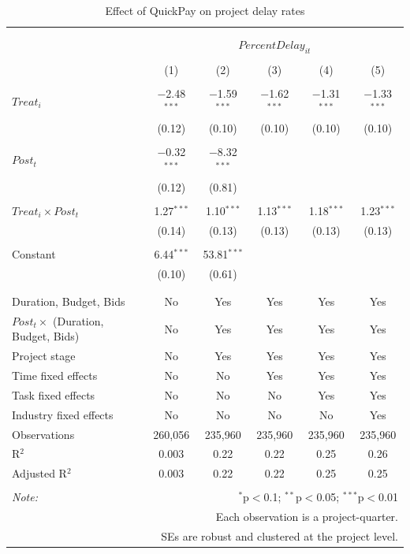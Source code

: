 \documentclass[
]{article}
\begin{document}
\begin{table}[H] \centering 
  \caption{Effect of QuickPay on project delay rates} 
  \label{} 
\small 
\begin{tabular}{@{\extracolsep{-2pt}}lccccc} 
\\[-1.8ex]\hline 
\hline \\[-1.8ex] 
\\[-1.8ex] & \multicolumn{5}{c}{$PercentDelay_{it}$} \\ 
\\[-1.8ex] & (1) & (2) & (3) & (4) & (5)\\ 
\hline \\[-1.8ex] 
 $Treat_i$ & $-$2.48$^{***}$ & $-$1.59$^{***}$ & $-$1.62$^{***}$ & $-$1.31$^{***}$ & $-$1.33$^{***}$ \\ 
  & (0.12) & (0.10) & (0.10) & (0.10) & (0.10) \\ 
  & & & & & \\ 
 $Post_t$ & $-$0.32$^{***}$ & $-$8.32$^{***}$ &  &  &  \\ 
  & (0.12) & (0.81) &  &  &  \\ 
  & & & & & \\ 
 $Treat_i \times Post_t$ & 1.27$^{***}$ & 1.10$^{***}$ & 1.13$^{***}$ & 1.18$^{***}$ & 1.23$^{***}$ \\ 
  & (0.14) & (0.13) & (0.13) & (0.13) & (0.13) \\ 
  & & & & & \\ 
 Constant & 6.44$^{***}$ & 53.81$^{***}$ &  &  &  \\ 
  & (0.10) & (0.61) &  &  &  \\ 
  & & & & & \\ 
\hline \\[-1.8ex] 
Duration, Budget, Bids & No & Yes & Yes & Yes & Yes \\ 
$Post_t \times$  (Duration, Budget, Bids) & No & Yes & Yes & Yes & Yes \\ 
Project stage & No & Yes & Yes & Yes & Yes \\ 
Time fixed effects & No & No & Yes & Yes & Yes \\ 
Task fixed effects & No & No & No & Yes & Yes \\ 
Industry fixed effects & No & No & No & No & Yes \\ 
Observations & 260,056 & 235,960 & 235,960 & 235,960 & 235,960 \\ 
R$^{2}$ & 0.003 & 0.22 & 0.22 & 0.25 & 0.26 \\ 
Adjusted R$^{2}$ & 0.003 & 0.22 & 0.22 & 0.25 & 0.25 \\ 
\hline 
\hline \\[-1.8ex] 
\textit{Note:}  & \multicolumn{5}{r}{$^{*}$p$<$0.1; $^{**}$p$<$0.05; $^{***}$p$<$0.01} \\ 
 & \multicolumn{5}{r}{Each observation is a project-quarter.} \\ 
 & \multicolumn{5}{r}{SEs are robust and clustered at the project level.} \\ 
\end{tabular} 
\end{table}
\end{document}
